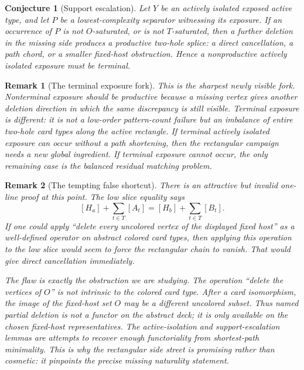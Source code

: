 \documentclass[11pt]{article}
\newtheorem{conjecture}{Conjecture}
\newtheorem{remark}{Remark}
\begin{document}
\begin{conjecture}[Support escalation]
Let \(Y\) be an actively isolated exposed active type, and let \(P\) be a
lowest-complexity separator witnessing its exposure.  If an occurrence of \(P\)
is not \(O\)-saturated, or is not \(T\)-saturated, then a further deletion in
the missing side produces a productive two-hole splice: a direct cancellation,
a path chord, or a smaller fixed-host obstruction.  Hence a nonproductive
actively isolated exposure must be terminal.
\end{conjecture}

\begin{remark}[The terminal exposure fork]
This is the sharpest newly visible fork.  Nonterminal exposure should be
productive because a missing vertex gives another deletion direction in which
the same discrepancy is still visible.  Terminal exposure is different: it is
not a low-order pattern-count failure but an imbalance of entire two-hole card
types along the active rectangle.  If terminal actively isolated exposure can
occur without a path shortening, then the rectangular campaign needs a new
global ingredient.  If terminal exposure cannot occur, the only remaining
case is the balanced residual matching problem.
\end{remark}

\begin{remark}[The tempting false shortcut]
There is an attractive but invalid one-line proof at this point.  The low
slice equality says
\[
  [H_a]+\sum_{t\in T}[A_t]
  =
  [H_b]+\sum_{t\in T}[B_t].
\]
If one could apply ``delete every uncolored vertex of the displayed fixed
host'' as a well-defined operator on abstract colored card types, then applying
this operation to the low slice would seem to force the rectangular chain to
vanish.  That would give direct cancellation immediately.

The flaw is exactly the obstruction we are studying.  The operation
``delete the vertices of \(O\)'' is not intrinsic to the colored card type.
After a card isomorphism, the image of the fixed-host set \(O\) may be a
different uncolored subset.  Thus named partial deletion is not a functor on
the abstract deck; it is only available on the chosen fixed-host
representatives.  The active-isolation and support-escalation lemmas are
attempts to recover enough functoriality from shortest-path minimality.  This
is why the rectangular side street is promising rather than cosmetic: it
pinpoints the precise missing naturality statement.
\end{remark}
\end{document}
